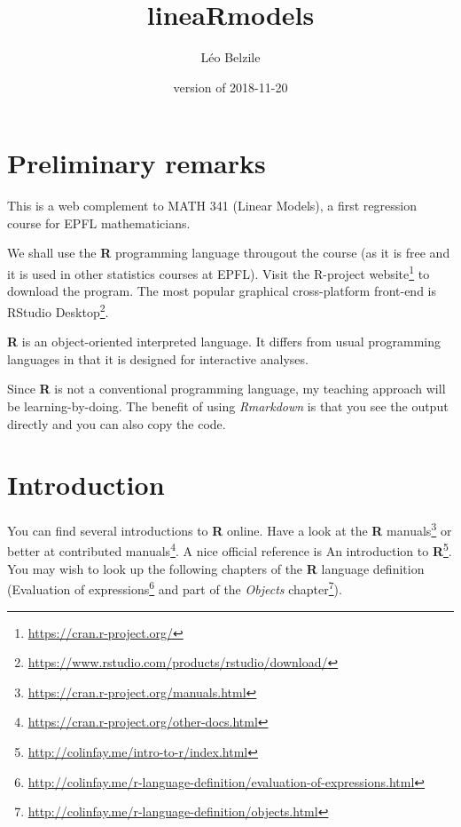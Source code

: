 \documentclass[]{book}
\title{lineaRmodels}
\author{Léo Belzile}
\date{version of 2018-11-20}
\let\rmarkdownfootnote\footnote%
\def\footnote{\protect\rmarkdownfootnote}
\renewcommand{\href}[2]{#2\footnote{\url{#1}}}
\theoremstyle{definition}
\theoremstyle{definition}
\theoremstyle{definition}
\theoremstyle{remark}
\begin{document}
\maketitle

{
\setcounter{tocdepth}{1}
\tableofcontents
}
\hypertarget{preliminary-remarks}{%
\chapter*{Preliminary remarks}\label{preliminary-remarks}}

This is a web complement to MATH 341 (Linear Models), a first regression
course for EPFL mathematicians.

We shall use the \textbf{R} programming language througout the course
(as it is free and it is used in other statistics courses at EPFL).
Visit \href{https://cran.r-project.org/}{the R-project website} to
download the program. The most popular graphical cross-platform
front-end is
\href{https://www.rstudio.com/products/rstudio/download/}{RStudio
Desktop}.

\textbf{R} is an object-oriented interpreted language. It differs from
usual programming languages in that it is designed for interactive
analyses.

Since \textbf{R} is not a conventional programming language, my teaching
approach will be learning-by-doing. The benefit of using
\emph{Rmarkdown} is that you see the output directly and you can also
copy the code.

\newcommand{\bs}[1]{\boldsymbol{#1}}
\newcommand{\Hmat}{\mathbf{H}}
\newcommand{\Mmat}{\mathbf{M}}
\newcommand{\mX}{\mathbf{X}}
\newcommand{\bX}{{\mathbf{X}}}
\newcommand{\bx}{{\mathbf{x}}}
\newcommand{\by}{{\boldsymbol{y}}}
\newcommand{\bY}{{\boldsymbol{Y}}}
\newcommand{\eps}{\varepsilon}
\newcommand{\beps}{\boldsymbol{\varepsilon}}
\newcommand{\bbeta}{\boldsymbol{\beta}}
\newcommand{\hbb}{\hat{\boldsymbol{\beta}}}
\newcommand{\limni}{\lim_{n \ra \infty}}
\newcommand{\Sp}{\mathscr{S}}
\newcommand{\E}[2][]{{\mathsf E}_{#1}\left(#2\right)}
\newcommand{\Va}[2][]{{\mathsf{Var}_{#1}}\left(#2\right)}
\newcommand{\I}[1]{{\mathbf 1}_{#1}}

\hypertarget{introduction}{%
\chapter{Introduction}\label{introduction}}

You can find several introductions to \textbf{R} online. Have a look at
the \href{https://cran.r-project.org/manuals.html}{\textbf{R} manuals}
or better at
\href{https://cran.r-project.org/other-docs.html}{contributed manuals}.
A nice official reference is
\href{http://colinfay.me/intro-to-r/index.html}{An introduction to
\textbf{R}}. You may wish to look up the following chapters of the
\textbf{R} language definition
(\href{http://colinfay.me/r-language-definition/evaluation-of-expressions.html}{Evaluation
of expressions} and part of the
\href{http://colinfay.me/r-language-definition/objects.html}{\emph{Objects}
chapter}).
\end{document}
